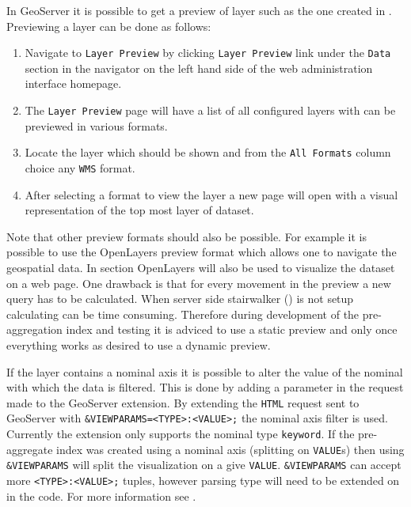 
In GeoServer it is possible to get a preview of layer such as the one
created in . Previewing a layer can be done as
follows:

\begin{enumerate}
	\item Navigate to \lstinline|Layer Preview| by clicking \lstinline|Layer Preview| link under the \lstinline|Data| section in the navigator on the left hand side of the web administration interface homepage.
	\item The \lstinline|Layer Preview| page will have a list of all configured layers with can be previewed in various formats.
	\item Locate the layer which should be shown and from the \lstinline|All Formats| column choice any \lstinline|WMS| format.
	\item After selecting a format to view the layer a new page will open with a visual representation of the top most layer of dataset.
\end{enumerate}

Note that other preview formats should also be possible. For example it is
possible to use the OpenLayers preview format which allows one to navigate
the geospatial data. In section  OpenLayers will
also be used to visualize the dataset on a web page. One drawback is that
for every movement in the preview a new query has to be calculated. When
server side stairwalker () is not setup
calculating can be time consuming. Therefore during development of the
pre-aggregation index and testing it is adviced to use a static preview and
only once everything works as desired to use a dynamic preview.

If the layer contains a nominal axis it is possible to alter the value of
the nominal with which the data is filtered. This is done by adding a
parameter in the request made to the GeoServer extension. By extending the
\lstinline|HTML| request sent to GeoServer with
\lstinline|&VIEWPARAMS=<TYPE>:<VALUE>;| the nominal axis filter is used.
Currently the extension only supports the nominal type \lstinline|keyword|.
If the pre-aggregate index was created using a nominal axis (splitting on
\lstinline|VALUE|s) then using \lstinline|&VIEWPARAMS| will split the
visualization on a give \lstinline|VALUE|. \lstinline|&VIEWPARAMS| can
accept more \lstinline|<TYPE>:<VALUE>;| tuples, however parsing type will
need to be extended on in the code. For more information see
.

